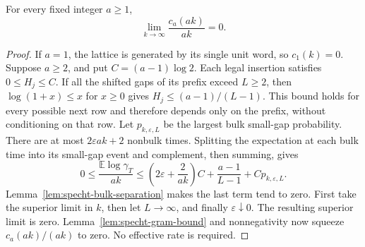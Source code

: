 \begin{lemma}
\label{lem:specht-limit}
\leanok
For every fixed integer $a\ge1$,
\[
 \lim_{k\to\infty}\frac{c_a(ak)}{ak}=0.
\]
\end{lemma}
\begin{proof}
If $a=1$, the lattice is generated by its single unit word, so $c_1(k)=0$.
Suppose $a\ge2$, and put $C=(a-1)\log2$. Each legal insertion satisfies
$0\le H_j\le C$. If all the shifted gaps of its prefix exceed $L\ge2$,
then $\log(1+x)\le x$ for $x\ge0$ gives
$H_j\le(a-1)/(L-1)$. This bound holds for every possible next row and
therefore depends only on the prefix, without conditioning on that row.
Let $p_{k,\varepsilon,L}$ be the largest bulk small-gap probability.
There are at most $2\varepsilon ak+2$ nonbulk times. Splitting the
expectation at each bulk time into its small-gap event and complement,
then summing, gives
\[
 0\le\frac{\mathbb E\log\gamma_T}{ak}
 \le\left(2\varepsilon+\frac2{ak}\right)C
       +\frac{a-1}{L-1}+C p_{k,\varepsilon,L}.
\]
Lemma~\ref{lem:specht-bulk-separation} makes the last term tend to zero.
First take the superior limit in $k$, then let $L\to\infty$, and finally
$\varepsilon\downarrow0$. The resulting superior limit is zero.
Lemma~\ref{lem:specht-gram-bound} and nonnegativity now squeeze
$c_a(ak)/(ak)$ to zero. No effective rate is required.
\end{proof}
